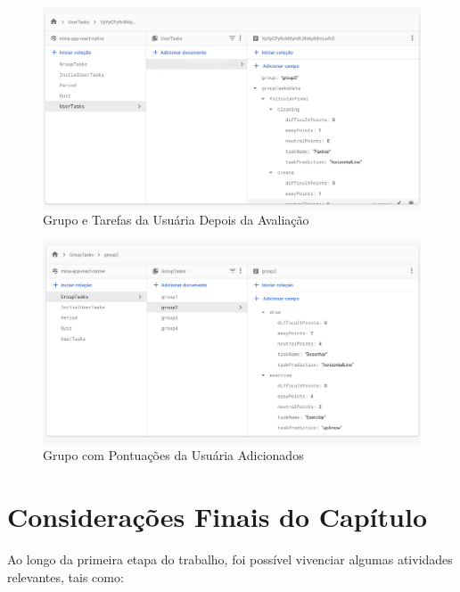 \begin{figure}[ht]
	\caption{Grupo e Tarefas da Usuária Depois da Avaliação}
	\begin{center}
	\includegraphics[keepaspectratio=true,scale=0.37]{figuras/db4.jpeg}
	\end{center}
    \label{fig24}
\end{figure}

\begin{figure}[ht]
	\caption{Grupo com Pontuações da Usuária Adicionados}
	\begin{center}
	\includegraphics[keepaspectratio=true,scale=0.37]{figuras/db3.png}
	\end{center}
    \label{fig25}
\end{figure}


\section{Considerações Finais do Capítulo}

Ao longo da primeira etapa do trabalho, foi possível vivenciar algumas atividades relevantes, tais como:


